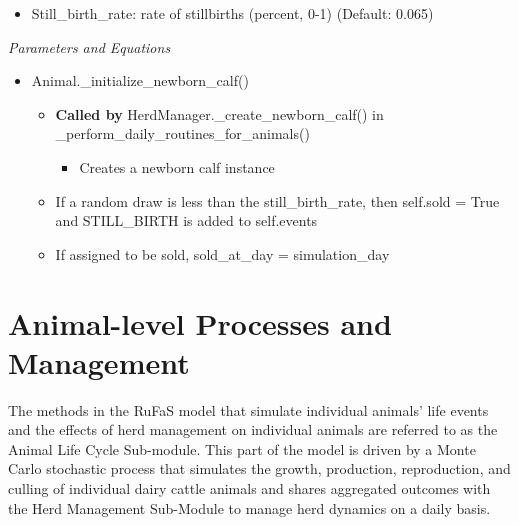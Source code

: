 \begin{refsection}
         \begin{itemize}
             \item Still\_birth\_rate: rate of stillbirths (percent, 0-1) (Default: 0.065)

         \end{itemize}

         \textit{Parameters and Equations}
         \vspace{0.1cm}
    
        \begin{itemize}
            \item Animal.\_initialize\_newborn\_calf()
            \begin{itemize}
                \item \textbf{Called by} HerdManager.\_create\_newborn\_calf() in \_perform\_daily\_routines\_for\_animals()
                \begin{itemize}
                    \item Creates a newborn calf instance
                \end{itemize}
                \item If a random draw is less than the still\_birth\_rate, then self.sold = True and STILL\_BIRTH is added to self.events
                \item If assigned to be sold, sold\_at\_day = simulation\_day 

            \end{itemize} 
        \end{itemize}






\section{Animal-level Processes and Management}
The methods in the RuFaS model that simulate individual animals’ life events and the effects of herd management on individual animals are referred to as the Animal Life Cycle Sub-module. This part of the model is driven by a Monte Carlo stochastic process that simulates the growth, production, reproduction, and culling of individual dairy cattle animals and shares aggregated outcomes with the Herd Management Sub-Module to manage herd dynamics on a daily basis.


\end{refsection}
